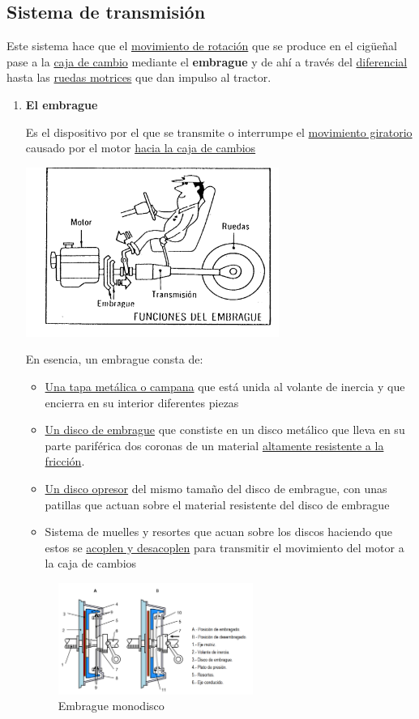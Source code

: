 \documentclass[a4paper,12pt,oneside]{book}
\begin{document}
\subsection{Sistema de transmisión}
\label{sec:org1c3fb0c}
Este sistema hace que el \uline{movimiento de rotación} que se produce en el cigüeñal
pase a la \uline{caja de cambio} mediante el \textbf{embrague} y de ahí a través del
\uline{diferencial} hasta las \uline{ruedas motrices} que dan impulso al tractor.
\begin{enumerate}
\item \textbf{El embrague}
\label{sec:orgc3a9bc9}

Es el dispositivo por el que se transmite o interrumpe el \uline{movimiento
giratorio} causado por el motor \uline{hacia la caja de cambios}
\begin{center}
\includegraphics[width=0.65\textwidth]{./img_0009/embrague_1.png}
\end{center}
En esencia, un embrague consta de:
\begin{itemize}
\item \uline{Una tapa metálica o campana} que está unida al volante de inercia y que
encierra en su interior diferentes piezas
\item \uline{Un disco de embrague} que constiste en un disco metálico que lleva en su
parte pariférica dos coronas de un material \uline{altamente resistente a la fricción}.
\item \uline{Un disco opresor} del mismo tamaño del disco de embrague, con unas patillas
que actuan sobre el material resistente del disco de embrague
\item Sistema de muelles y resortes que acuan sobre los discos haciendo que estos se
\uline{acoplen y desacoplen} para transmitir el movimiento del motor a la caja de
cambios
\end{itemize}
\begin{figure}[htbp]
\centering
\includegraphics[width=0.6\textwidth]{./img_0009/embrague.png}
\caption{Embrague monodisco}
\end{figure}


\end{enumerate}
\end{document}

